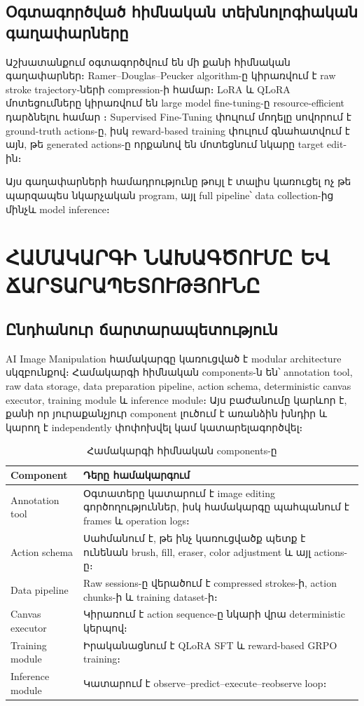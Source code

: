 \documentclass[12pt,a4paper]{report}
\newcommand{\Eng}[1]{\textenglish{#1}}
\begin{document}
\section{Օգտագործված հիմնական տեխնոլոգիական գաղափարները}

Աշխատանքում օգտագործվում են մի քանի հիմնական գաղափարներ։ \Eng{Ramer--Douglas--Peucker} algorithm-ը կիրառվում է raw stroke trajectory-ների compression-ի համար։ \Eng{LoRA} և \Eng{QLoRA} մոտեցումները կիրառվում են large model fine-tuning-ը resource-efficient դարձնելու համար \cite{Hu2022,Dettmers2023}։ \Eng{Supervised Fine-Tuning} փուլում մոդելը սովորում է ground-truth actions-ը, իսկ reward-based training փուլում գնահատվում է այն, թե generated actions-ը որքանով են մոտեցնում նկարը target edit-ին։

Այս գաղափարների համադրությունը թույլ է տալիս կառուցել ոչ թե պարզապես նկարչական program, այլ full pipeline՝ data collection-ից մինչև model inference։

\chapter{ՀԱՄԱԿԱՐԳԻ ՆԱԽԱԳԾՈՒՄԸ ԵՎ ՃԱՐՏԱՐԱՊԵՏՈՒԹՅՈՒՆԸ}

\section{Ընդհանուր ճարտարապետություն}

\Eng{AI Image Manipulation} համակարգը կառուցված է modular architecture սկզբունքով։ Համակարգի հիմնական components-ն են՝ annotation tool, raw data storage, data preparation pipeline, action schema, deterministic canvas executor, training module և inference module։ Այս բաժանումը կարևոր է, քանի որ յուրաքանչյուր component լուծում է առանձին խնդիր և կարող է independently փոփոխվել կամ կատարելագործվել։

\begin{table}[H]
\caption{Համակարգի հիմնական components-ը}
\centering
\begin{tabularx}{\textwidth}{p{4cm}X}
\toprule
\textbf{Component} & \textbf{Դերը համակարգում} \\
\midrule
\Eng{Annotation tool} & Օգտատերը կատարում է image editing գործողություններ, իսկ համակարգը պահպանում է frames և operation logs։ \\
\Eng{Action schema} & Սահմանում է, թե ինչ կառուցվածք պետք է ունենան brush, fill, eraser, color adjustment և այլ actions-ը։ \\
\Eng{Data pipeline} & Raw sessions-ը վերածում է compressed strokes-ի, action chunks-ի և training dataset-ի։ \\
\Eng{Canvas executor} & Կիրառում է action sequence-ը նկարի վրա deterministic կերպով։ \\
\Eng{Training module} & Իրականացնում է \Eng{QLoRA SFT} և reward-based \Eng{GRPO} training։ \\
\Eng{Inference module} & Կատարում է observe--predict--execute--reobserve loop։ \\
\bottomrule
\end{tabularx}
\end{table}
\end{document}
